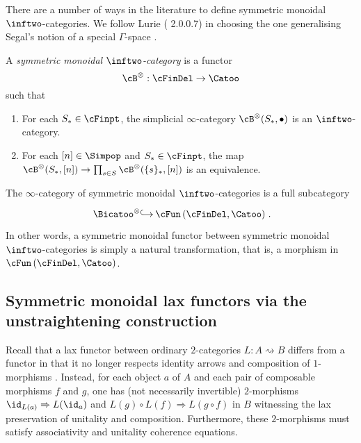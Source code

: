 \documentclass[a4paper]{article}
\numberwithin{equation}{section}
\begin{document}
There are a number of ways in the literature to define symmetric monoidal $\inftwo$-categories. We follow Lurie (\cite{LurieHA} 2.0.0.7) in choosing the one generalising Segal's notion of a special $\Gamma$-space \cite{SegalGamma}. 
\begin{defn}
 A {\em symmetric monoidal $\inftwo$-category} is a functor 
 \begin{equation*}
 \cB^\otimes :\cFinDel\to \Catoo
 \end{equation*}
 such that
 \begin{enumerate}
  \item For each $S_* \in \cFinpt$, the simplicial $\infty$-category $\cB^\otimes(S_*,\bullet)$ is an $\inftwo$-category.
  \item For each $[n] \in \Simpop$ and $S_* \in \cFinpt$, the map $\cB^\otimes(S_*,[n]) \to \prod_{s \in S} \cB^\otimes(\{s\}_*, [n])$ is an equivalence.
 \end{enumerate}
\end{defn}
 The $\infty$-category of symmetric monoidal $\inftwo$-categories is a full subcategory 
 \begin{equation*}
 \xymatrixcolsep{.8pc}\xymatrix{ \Bicatoo^\otimes \ar@{^{(}->}[r] & \cFun\left(\cFinDel, \Catoo \right)}.
 \end{equation*}
 In other words, a symmetric monoidal functor between symmetric monoidal $\inftwo$-categories is simply a natural transformation, that is, a morphism in $\cFun\left(\cFinDel, \Catoo \right)$. 

\subsection{Symmetric monoidal lax functors via the unstraightening construction}
\label{Sec:laxfun}

Recall that a lax functor between ordinary $2$-categories $L: A \rightsquigarrow B$ differs from a functor in that it no longer respects identity arrows and composition of $1$-morphisms \cite{LackComp}. Instead, for each object $a$ of $A$ and each pair of composable morphisms $f$ and $g$, one has (not necessarily invertible) $2$-morphisms $\id_{L(a)} \Rightarrow L(\id_a)$ and $L(g) \circ L(f) \Rightarrow L(g \circ f)$ in $B$ witnessing the lax preservation of unitality and composition. Furthermore, these $2$-morphisms must satisfy associativity and unitality coherence equations.
\end{document}
